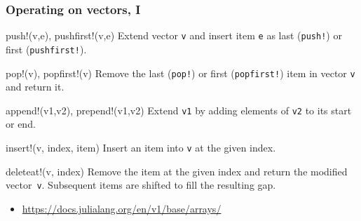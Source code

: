 \documentclass[english,serif,mathserif,xcolor=pdftex,dvipsnames,table]{beamer}
\begin{document}
\begin{frame}
  \frametitle{Operating on vectors, I}
  \smaller

  \begin{describe}{\ttfamily push!(v,e), pushfirst!(v,e)}
    Extend vector \texttt{v} and insert item \texttt{e} as last
    (\texttt{push!}) or first (\texttt{pushfirst!}).
  \end{describe}

  \begin{describe}{\ttfamily pop!(v), popfirst!(v)}
    Remove the last (\texttt{pop!}) or first (\texttt{popfirst!}) item
    in vector \texttt{v} and return it.
  \end{describe}

  \begin{describe}{\ttfamily append!(v1,v2), prepend!(v1,v2)}
    Extend \texttt{v1} by adding elements of \texttt{v2} to its start or end.
  \end{describe}

  \begin{describe}{\ttfamily insert!(v, index, item)}
    Insert an item into \texttt{v} at the given index.
  \end{describe}

  \begin{describe}{\ttfamily deleteat!(v, index)}
    Remove the item at the given index and return the modified vector~\texttt{v}.
    Subsequent items are shifted to fill the resulting gap.
  \end{describe}

  \+
  \begin{references}
    \begin{itemize}
    \item \url{https://docs.julialang.org/en/v1/base/arrays/}
  \end{itemize}
  \end{references}
\end{frame}
\end{document}

